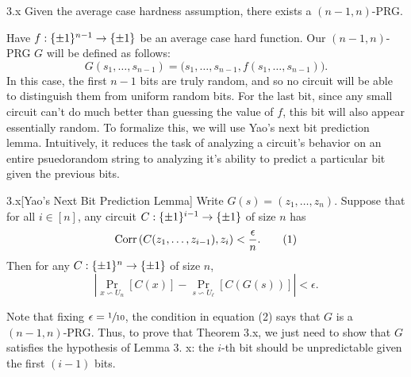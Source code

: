 \documentclass[11pt]{article}
\begin{document}
\begin{theorem}{3.x}
    Given the average case hardness assumption, there exists a $(n - 1, n)$-PRG.
\end{theorem}
\noindent
Have $f : \{\pm 1\}^{n - 1} \rightarrow \{\pm 1\}$ be an average case hard function. Our $(n - 1, n)$-PRG $G$ will be defined as follows:
\begin{equation*}
    G(s_1, \ldots, s_{n - 1}) = \bigl(s_1, \ldots, s_{n - 1}, f(s_1, \ldots, s_{n - 1})\bigr).
\end{equation*}
In this case, the first $n - 1$ bits are truly random, and so no circuit will be able to distinguish them from uniform random bits. For the last bit, since any small circuit can't do much better than guessing the value of $f$, this bit will also appear essentially random. To formalize this, we will use Yao's next bit prediction lemma. Intuitively, it reduces the task of analyzing a circuit's behavior on an entire psuedorandom string to analyzing it's ability to predict a particular bit given the previous bits.
\begin{lemma}{3.x}[Yao's Next Bit Prediction Lemma]
    Write $G(s) = (z_1, \ldots, z_n)$. Suppose that for all $i \in [n]$, any circuit $C : \{\pm 1\}^{i - 1} \rightarrow \{\pm 1\}$ of size $n$ has 
    \begin{equation*}
        \mathrm{Corr}\left(C(z_1, \ldots, z_{i - 1}), z_i\right) < \frac{\epsilon}{n}. \tag{1}
    \end{equation*}
    Then for any $C : \{\pm 1\}^n \rightarrow \{\pm 1\}$ of size $n$, 
    \begin{equation*}
        \left|\Pr_{x \backsim U_n}[C(x)] - \Pr_{s \backsim U_\ell}[C(G(s))]\right| < \epsilon. \tag{2}
    \end{equation*}
\end{lemma}
Note that fixing $\epsilon = \sfrac{1}{10}$, the condition in equation (2) says that $G$ is a $(n - 1, n)$-PRG. Thus, to prove that Theorem 3.x, we just need to show that $G$ satisfies the hypothesis of Lemma 3. x: the $i$-th bit should be unpredictable given the first $(i - 1)$ bits.
\end{document}
